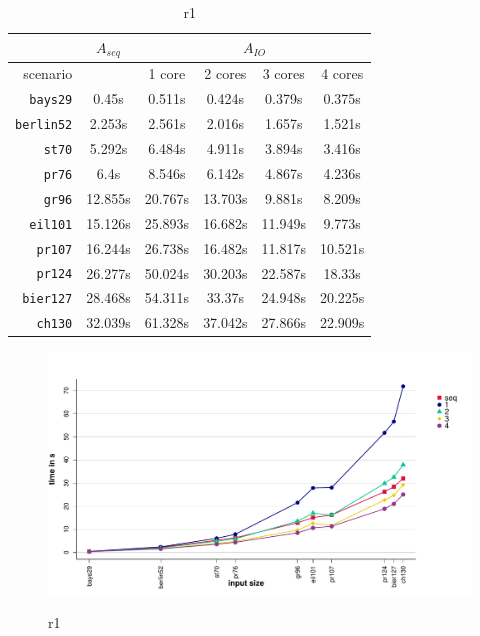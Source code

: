 \begin{table}[h!]
  \centering
  \begin{tabular}{r|c||c|c|c|c|}
    \cline{2-6}
    & \multicolumn{1}{c||}{$A_{seq}$} & \multicolumn{4}{c|}{$A_{IO}$} \\
    \hline
    \multicolumn{1}{|r||}{scenario} & & 1 core & 2 cores & 3 cores & 4 cores \\
    \hline
    \hline
    \multicolumn{1}{|r||}{\texttt{bays29}} & 0.45s & 0.511s & 0.424s & 0.379s & 0.375s \\
    \hline
    \multicolumn{1}{|r||}{\texttt{berlin52}} & 2.253s & 2.561s & 2.016s & 1.657s & 1.521s \\
    \hline
    \multicolumn{1}{|r||}{\texttt{st70}} & 5.292s & 6.484s & 4.911s & 3.894s & 3.416s \\
    \hline
    \multicolumn{1}{|r||}{\texttt{pr76}} & 6.4s & 8.546s & 6.142s & 4.867s & 4.236s \\
    \hline
    \multicolumn{1}{|r||}{\texttt{gr96}} & 12.855s & 20.767s & 13.703s & 9.881s & 8.209s \\
    \hline
    \multicolumn{1}{|r||}{\texttt{eil101}} & 15.126s & 25.893s & 16.682s & 11.949s & 9.773s \\
    \hline
    \multicolumn{1}{|r||}{\texttt{pr107}} & 16.244s & 26.738s & 16.482s & 11.817s & 10.521s \\
    \hline
    \multicolumn{1}{|r||}{\texttt{pr124}} & 26.277s & 50.024s & 30.203s & 22.587s & 18.33s \\
    \hline
    \multicolumn{1}{|r||}{\texttt{bier127}} & 28.468s & 54.311s & 33.37s & 24.948s & 20.225s \\
    \hline
    \multicolumn{1}{|r||}{\texttt{ch130}} & 32.039s & 61.328s & 37.042s & 27.866s & 22.909s \\
    \hline
  \end{tabular}
  \caption{r1}
  \label{tbl:variation_ameisenanzahl}
\end{table}


\begin{figure}[h!]
  \centering
  \includegraphics[width=\textwidth]{img/test_local_1.pdf}
  \label{fig:test_local_1}
  \caption{r1}
\end{figure}



